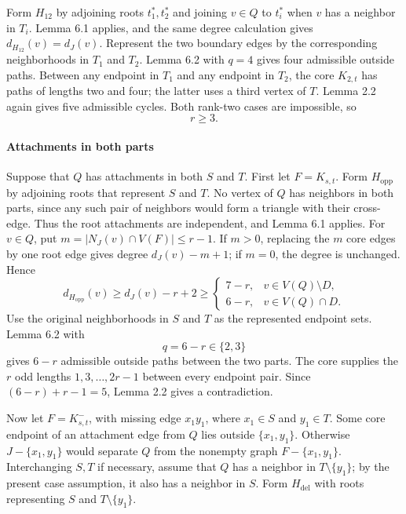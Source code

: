 \documentclass[
  11pt]{article}
\begin{document}
Form \(H_{12}\) by adjoining roots \(t_1^*,t_2^*\) and joining
\(v\in Q\) to \(t_i^*\) when \(v\) has a neighbor in \(T_i\). Lemma 6.1
applies, and the same degree calculation gives \(d_{H_{12}}(v)=d_J(v)\).
Represent the two boundary edges by the corresponding neighborhoods in
\(T_1\) and \(T_2\). Lemma 6.2 with \(q=4\) gives four admissible
outside paths. Between any endpoint in \(T_1\) and any endpoint in
\(T_2\), the core \(K_{2,t}\) has paths of lengths two and four; the
latter uses a third vertex of \(T\). Lemma 2.2 again gives five
admissible cycles. Both rank-two cases are impossible, so \[
 r\ge3. \tag{6.3}
\]

\paragraph{Attachments in both parts}\label{attachments-in-both-parts}

Suppose that \(Q\) has attachments in both \(S\) and \(T\). First let
\(F=K_{s,t}\). Form \(H_{\mathrm{opp}}\) by adjoining roots that
represent \(S\) and \(T\). No vertex of \(Q\) has neighbors in both
parts, since any such pair of neighbors would form a triangle with their
cross-edge. Thus the root attachments are independent, and Lemma 6.1
applies. For \(v\in Q\), put \(m=|N_J(v)\cap V(F)|\le r-1\). If \(m>0\),
replacing the \(m\) core edges by one root edge gives degree
\(d_J(v)-m+1\); if \(m=0\), the degree is unchanged. Hence \[
 d_{H_{\mathrm{opp}}}(v)\ge d_J(v)-r+2
 \ge
 \begin{cases}
  7-r,&v\in V(Q)\setminus D,\\
  6-r,&v\in V(Q)\cap D.
 \end{cases} \tag{6.4}
\] Use the original neighborhoods in \(S\) and \(T\) as the represented
endpoint sets. Lemma 6.2 with \[
 q=6-r\in\{2,3\}
\] gives \(6-r\) admissible outside paths between the two parts. The
core supplies the \(r\) odd lengths \(1,3,\ldots,2r-1\) between every
endpoint pair. Since \((6-r)+r-1=5\), Lemma 2.2 gives a contradiction.

Now let \(F=K_{s,t}^-\), with missing edge \(x_1y_1\), where
\(x_1\in S\) and \(y_1\in T\). Some core endpoint of an attachment edge
from \(Q\) lies outside \(\{x_1,y_1\}\). Otherwise \(J-\{x_1,y_1\}\)
would separate \(Q\) from the nonempty graph \(F-\{x_1,y_1\}\).
Interchanging \(S,T\) if necessary, assume that \(Q\) has a neighbor in
\(T\setminus\{y_1\}\); by the present case assumption, it also has a
neighbor in \(S\). Form \(H_{\mathrm{del}}\) with roots representing
\(S\) and \(T\setminus\{y_1\}\).
\end{document}
